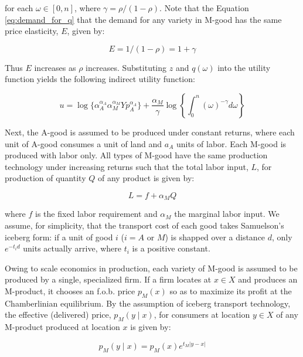 for each $\omega \in [0, n]$, where $\gamma = \rho / (1 - \rho)$. Note that the Equation \eqref{eq:demand_for_q} that the demand for any variety in M-good has the same price elasticity, $E$, given by:

\begin{equation}
    E = 1 / (1 - \rho) = 1 + \gamma
\end{equation}

Thus $E$ increases as $\rho$ increases. Substituting $z$ and $q(\omega)$ into the utility function yields the following indirect utility function:

\begin{equation}
    u = \log\{\alpha_A^{\alpha_A} \alpha_M^{\alpha_M}Yp_A^{\alpha_A}\} + \frac{\alpha_M}{\gamma} \log \left\{ \int_0^n (\omega)^{-\gamma} d\omega \right\}
\end{equation}

Next, the A-good is assumed to be produced under constant returns, where each unit of A-good consumes a unit of land and $a_A$ units of labor. Each M-good is produced with labor only. All types of M-good have the same production technology under increasing returns such that the total labor input, $L$, for production of quantity $Q$ of any product is given by:

\begin{equation}
   L = f + \alpha_M Q 
\end{equation}

where $f$ is the fixed labor requirement and $\alpha_M$ the marginal labor input. We assume, for simplicity, that the transport cost of each good takes Samuelson's iceberg form: if a unit of good $i$ ($i = A \text{ or } M$) is shapped over a distance $d$, only $e^{-t_i d}$ units actually arrive, where $t_i$ is a positive constant.

Owing to scale economics in production, each variety of M-good is assumed to be produced by a single, specialized firm. If a firm locates at $x \in X$ and produces an M-product, it chooses an f.o.b. price $p_M(x)$ so as to maximize its profit at the Chamberlinian equilibrium. By the assumption of iceberg transport technology, the effective (delivered) price, $p_M(y \mid x)$, for consumers at location $y \in X$ of any M-product produced at location $x$ is given by:

\begin{equation}
  p_M(y \mid x) = p_M(x) e^{t_M |y - x|}
  \label{eq:M_price_transport}
\end{equation}

